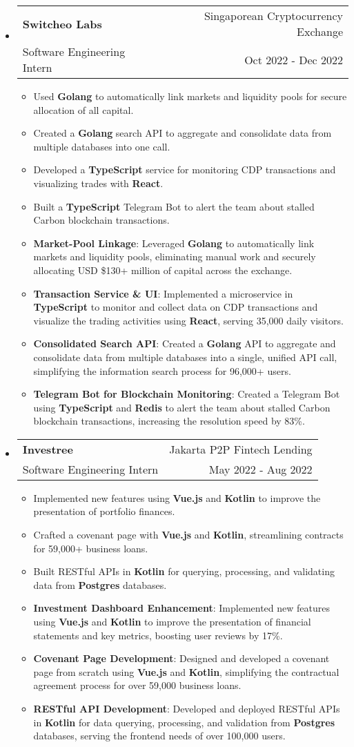 \documentclass[letterpaper, 11pt]{article}
\makeatletter
\newcommand{\ResumeEntryTSDL}[4]{
  \vspace{1pt}\item
    \begin{tabular*}{\textwidth}[t]{l@{\extracolsep{\fill}}r} 
      \textbf{#1} & #2 \\
      #3 & #4 \\
    \end{tabular*}\vspace{-2.835pt} %
}
\newcommand{\ResumeItem}[2]{
  \item{
    \textbf{#1}{: #2 \vspace{-2.835pt}}
  }
}
\newcommand{\ResumeItemDefault}[1]{
  \item{
    #1 \vspace{-2.835pt}
  }
}
\newcommand{\ResumeEntryStart}{\begin{itemize}[leftmargin=0mm, label={}]}
\newcommand{\ResumeEntryEnd}{\end{itemize}\vspace{-2.835pt}} %
\newcommand{\ResumeItemListStart}{\begin{itemize}[leftmargin=5mm, label=$\bullet$, itemsep=1mm, parsep=1mm]} %
\newcommand{\ResumeItemListEnd}{\end{itemize}}
\makeatother
\begin{document}
  \ResumeEntryStart
    \ResumeEntryTSDL{Switcheo Labs}{Singaporean Cryptocurrency Exchange}{Software Engineering Intern}{Oct 2022 - Dec 2022}
    \ResumeItemListStart
    \ResumeItemDefault{Used \textbf{Golang} to automatically link markets and liquidity pools for secure allocation of all capital.}
    \ResumeItemDefault{Created a \textbf{Golang} search API to aggregate and consolidate data from multiple databases into one call.}
    \ResumeItemDefault{Developed a \textbf{TypeScript} service for monitoring CDP transactions and visualizing trades with \textbf{React}.}
    \ResumeItemDefault{Built a \textbf{TypeScript} Telegram Bot to alert the team about stalled Carbon blockchain transactions.}
    \ResumeItem{Market-Pool Linkage}
      {Leveraged \textbf{Golang} to automatically link markets and liquidity pools, eliminating manual work and securely allocating USD \$130+ million of capital across the exchange.}
    \ResumeItem{Transaction Service \& UI}
      {Implemented a microservice in \textbf{TypeScript} to monitor and collect data on CDP transactions and visualize the trading activities using \textbf{React}, serving 35,000 daily visitors.}
    \ResumeItem{Consolidated Search API}
      {Created a \textbf{Golang} API to aggregate and consolidate data from multiple databases into a single, unified API call, simplifying the information search process for 96,000+ users.}
    \ResumeItem{Telegram Bot for Blockchain Monitoring}
      {Created a Telegram Bot using \textbf{TypeScript} and \textbf{Redis} to alert the team about stalled Carbon blockchain transactions, increasing the resolution speed by 83\%.}
    \ResumeItemListEnd
  \ResumeEntryEnd

  \ResumeEntryStart
    \ResumeEntryTSDL{Investree}{Jakarta P2P Fintech Lending}{Software Engineering Intern}{May 2022 - Aug 2022}
    \ResumeItemListStart
      \ResumeItemDefault{Implemented new features using \textbf{Vue.js} and \textbf{Kotlin} to improve the presentation of portfolio finances.}
      \ResumeItemDefault{Crafted a covenant page with \textbf{Vue.js} and \textbf{Kotlin}, streamlining contracts for 59,000+ business loans.}
      \ResumeItemDefault{Built RESTful APIs in \textbf{Kotlin} for querying, processing, and validating data from \textbf{Postgres} databases.}
      \ResumeItem{Investment Dashboard Enhancement}
      {Implemented new features using \textbf{Vue.js} and \textbf{Kotlin} to improve the presentation of financial statements and key metrics, boosting user reviews by 17\%.}
      \ResumeItem{Covenant Page Development}
        {Designed and developed a covenant page from scratch using \textbf{Vue.js} and \textbf{Kotlin}, simplifying the contractual agreement process for over 59,000 business loans.}
      \ResumeItem{RESTful API Development}
        {Developed and deployed RESTful APIs in \textbf{Kotlin} for data querying, processing, and validation from \textbf{Postgres} databases, serving the frontend needs of over 100,000 users.}
    \ResumeItemListEnd
  \ResumeEntryEnd
\end{document}
